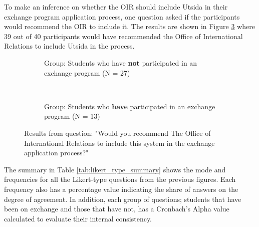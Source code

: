 \FloatBarrier


To make an inference on whether the OIR should include Utsida in their exchange program application process, one question asked if the participants would recommend the OIR to include it. The results are shown in Figure \ref{fig:office_recommendation} where 39 out of 40 participants would have recommended the Office of International Relations to include Utsida in the process. 

\FloatBarrier

\begin{figure}[h]
    \centering
    \begin{subfigure}[b]{0.4\textwidth}
        
        \caption{Group: Students who have \textbf{not} participated in an exchange program (N = 27)}
        \label{fig:office_recommendation_p1}
    \end{subfigure}
    ~ \qquad %
    \begin{subfigure}[b]{0.4\textwidth}
       
        \caption{Group: Students who \textbf{have} participated in an exchange program (N = 13)}
        \label{fig:office_recommendation_p2}
    \end{subfigure}
    \caption[Result from question on recommendation to OIR]{Results from question: "Would you recommend The Office of International Relations to include this system in the exchange application process?"}
    \label{fig:office_recommendation}
\end{figure}


\FloatBarrier

The summary in Table \ref{tab:likert_type_summary} shows the mode and frequencies for all the Likert-type questions from the previous figures. Each frequency also has a percentage value indicating the share of answers on the degree of agreement. In addition, each group of questions; students that have been on exchange and those that have not, has a Cronbach's Alpha value calculated to evaluate their internal consistency.


